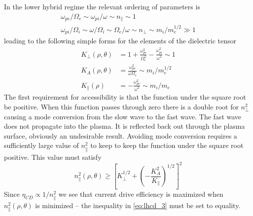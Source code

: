 In the lower hybrid regime the relevant ordering of parameters is
\begin{equation}
\begin{array} { c } { \omega _ { p e } / \Omega _ { e } \sim \omega _ { p i } / \omega \sim n _ { \| } \sim 1 } \\ { \omega _ { p i } / \Omega _ { i } \sim \omega / \Omega _ { i } \sim \Omega _ { e } / \omega \sim n _ { \perp } \sim m _ { i } / m _ { e } ^ { 1 / 2 } \gg 1 } \end{array}
\end{equation}
leading to the following simple forms for the elements of the dielectric tensor
\begin{equation}
	\begin{aligned} K _ { \perp } ( \rho , \theta ) & = 1 + \frac { \omega _ { p e } ^ { 2 } } { \Omega _ { e } ^ { 2 } } - \frac { \omega _ { p i } ^ { 2 } } { \omega ^ { 2 } } \sim 1 \\ K _ { A } ( \rho , \theta ) & = \frac { \omega _ { p e } ^ { 2 } } { \omega \Omega _ { e } } \sim m _ { i } / m _ { e } ^ { 1 / 2 } \\ K _ { \| } ( \rho ) & = - \frac { \omega _ { p e } ^ { 2 } } { \omega ^ { 2 } } \sim m _ { i } / m _ { e } \end{aligned}
\end{equation}
The first requirement for accessibility is that the function under the square root be positive. When this function passes through zero there is a double root for $n_\perp^2$ causing a mode conversion from the slow wave to the fast wave. The fast wave does not propagate into the plasma. It is reflected back out through the plasma surface, obviously an undesirable result. Avoiding mode conversion requires a sufficiently large value of $n_\parallel^2$ to keep to keep the function under the square root positive. This value must satisfy
\begin{equation}
	\label{eq:lhcd_3}
	n _ { \| } ^ { 2 } ( \rho , \theta ) \geq \left[ K _ { \perp } ^ { 1 / 2 } + \left( - \frac { K _ { A } ^ { 2 } } { K _ { \| } } \right) ^ { 1 / 2 } \right] ^ { 2 }
\end{equation}
Since $\eta_{CD} \propto 1 / n_\parallel^2$ we see that current drive efficiency is maximized when $n_\parallel^2(\rho,\theta)$ is minimized -- the inequality in \cref{eq:lhcd_3} must be set to equality.
 
